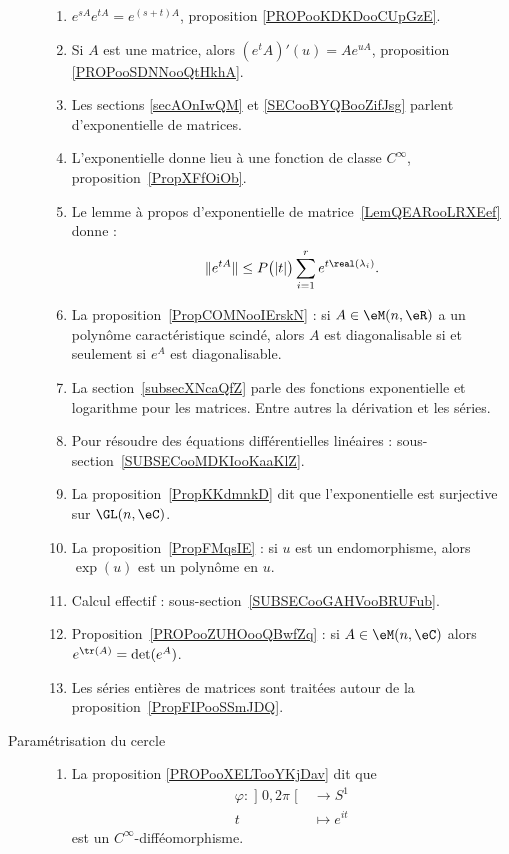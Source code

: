 \begin{description}
		\begin{enumerate}
			\item
			      \( e^{sA} e^{tA}= e^{(s+t)A}\), proposition \ref{PROPooKDKDooCUpGzE}.
			\item
			      Si \( A\) est une matrice, alors \( (e^tA)'(u)=Ae^{uA}\), proposition \ref{PROPooSDNNooQtHkhA}.
			\item
			      Les sections \ref{secAOnIwQM} et \ref{SECooBYQBooZifJsg} parlent d'exponentielle de matrices.
			\item
			      L'exponentielle donne lieu à une fonction de classe \(  C^{\infty}\), proposition~\ref{PropXFfOiOb}.
			\item
			      Le lemme à propos d'exponentielle de matrice~\ref{LemQEARooLRXEef} donne :
			      \begin{equation*}
				      \|  e^{tA} \|\leq P\big( | t | \big)\sum_{i=1}^r e^{t\real(\lambda_i)}.
			      \end{equation*}
			\item
			      La proposition~\ref{PropCOMNooIErskN} : si \( A\in \eM(n,\eR)\) a un polynôme caractéristique scindé, alors \( A\) est diagonalisable si et seulement si \( e^A\) est diagonalisable.
			\item
			      La section~\ref{subsecXNcaQfZ} parle des fonctions exponentielle et logarithme pour les matrices. Entre autres la dérivation et les séries.
			\item
			      Pour résoudre des équations différentielles linéaires : sous-section~\ref{SUBSECooMDKIooKaaKlZ}.
			\item
			      La proposition~\ref{PropKKdmnkD} dit que l'exponentielle est surjective sur \( \GL(n,\eC)\).
			\item

			      La proposition~\ref{PropFMqsIE} : si \( u\) est un endomorphisme, alors \( \exp(u)\) est un polynôme en \( u\).
			\item
			      Calcul effectif : sous-section~\ref{SUBSECooGAHVooBRUFub}.
			\item Proposition~\ref{PROPooZUHOooQBwfZq} : si \( A\in\eM(n,\eC)\) alors \( e^{\tr(A)}=\det( e^{A})\).
			\item
			      Les séries entières de matrices sont traitées autour de la proposition~\ref{PropFIPooSSmJDQ}.
		\end{enumerate}

	\item[Paramétrisation du cercle]
		\begin{enumerate}
			\item
			      La proposition \ref{PROPooXELTooYKjDav} dit que
			      \begin{equation}
				      \begin{aligned}
					      \varphi\colon \mathopen] 0,2\pi\mathclose[ & \to S^1        \\
					      t                                          & \mapsto e^{it}
				      \end{aligned}
			      \end{equation}
			      est un \( C^{\infty}\)-difféomorphisme.
		\end{enumerate}

\end{description}
